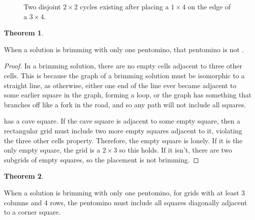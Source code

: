 \documentclass{article}
\newcommand{\pentU}{\smash{\colorbox{colorU!50}{U}}}
\theoremstyle{definition}%
\newtheorem{theorem}{Theorem}[section]
\begin{document}
\begin{figure}
    \centering
    \caption{Two disjoint $2 \times 2$ cycles existing after placing a $1 \times 4$ on the edge of a $3 \times 4$.}
    \label{fig:1x4in3x4}
\end{figure}

\begin{theorem}
\label{th:brimming1u}

When a solution is brimming with only one pentomino, that pentomino is not \pentU.
\end{theorem}

\begin{proof}
In a brimming solution, there are no empty cells adjacent to three other cells. This is because the graph of a brimming solution must be isomorphic to a straight line, as otherwise, either one end of the line ever became adjacent to some earlier square in the graph, forming a loop, or the graph has something that branches off like a fork in the road, and so any path will not include all squares.

\pentU{} has a cave square. If the cave square is adjacent to some empty square, then a rectangular grid must include two more empty squares adjacent to it, violating the three other cells property. Therefore, the empty square is lonely. If it is the only empty square, the grid is a $2 \times 3$ so this holds. If it isn't, there are two subgrids of empty squares, so the placement is not brimming.
\end{proof}

\begin{theorem}
\label{th:brimming1}

When a solution is brimming with only one pentomino, for grids with at least 3 columns and 4 rows, the pentomino must include all squares diagonally adjacent to a corner square.
\end{theorem}
\end{document}
